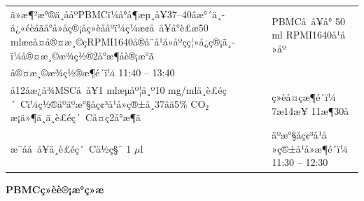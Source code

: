 \documentclass[UTF8,10pt,a4paper,fontset=fandol]{ctexart}
\newcommand{\fieldvalue}[1]{#1}
\newcommand{\handwritten}[1]{#1}
\begin{document}
\begin{center}
\begin{center}
\noindent
\begin{tabularx}{\textwidth}{|p{}|X|}
\hline
ä»æ¶²æ°®ä¸­ååºPBMCï¼å°å¶æµ¸å¥37--40âæ°´ä¸­å¿«éèåãå°å»å­ç®¡åç»èååºï¼ç¼æ¢å å¥å°è£æ50 mlæ¢å¤å®¤æ¸©çRPMI1640å®å¨å¹å»åºçç¦»å¿ç®¡ä¸­ï¼å®¤æ¸©æ¾ç½®2å°æ¶åè®¡æ°ã&
PBMCå å¥å°
\fieldvalue{\handwritten{50}} ml RPMI1640å¹å»åº\\
å®¤æ¸©æ¾ç½®æ¶é´ï¼
\fieldvalue{\handwritten{11:40}} --
\fieldvalue{\handwritten{13:40}}\\
\hline
å12å­æ¿å¾MSCå å¥1 mlæµåº¦ä¸º10 mg/mlä¸è£éç´ Cï¼ç½®äºäºæ°§åç¢³å¹å»ç®±ä¸­37âã5\% CO$_2$æ¡ä»¶ä¸ä¸è£éç´ Cå¤ç2å°æ¶ã&
ç»èå¤çæ¶é´ï¼
\fieldvalue{\handwritten{7æ14æ¥}}
\fieldvalue{\handwritten{11æ¶30å}}\\
æ¯å­å å¥ä¸è£éç´ Cä½ç§¯
\fieldvalue{\handwritten{1}} $\mu$l &
äºæ°§åç¢³å¹å»ç®±å¹å»æ¶é´ï¼
\fieldvalue{\handwritten{11:30}} --
\fieldvalue{\handwritten{12:30}}\\
\hline
\end{tabularx}

\begin{center}
\textbf{PBMCç»èè®¡æ°ç»æ}
\end{center}


\end{center}
\end{center}
\end{document}
